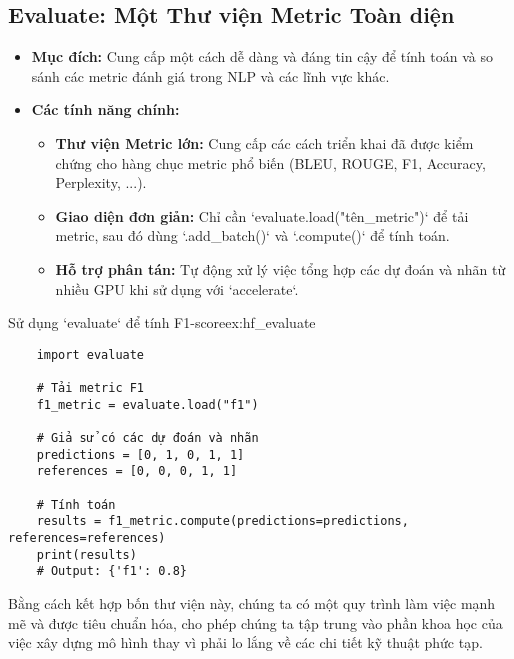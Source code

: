 \subsection{Evaluate: Một Thư viện Metric Toàn diện}
\label{ssec:hf_evaluate}
\begin{itemize}
    \item \textbf{Mục đích:} Cung cấp một cách dễ dàng và đáng tin cậy để tính toán và so sánh các metric đánh giá trong NLP và các lĩnh vực khác.
    \item \textbf{Các tính năng chính:}
        \begin{itemize}
            \item \textbf{Thư viện Metric lớn:} Cung cấp các cách triển khai đã được kiểm chứng cho hàng chục metric phổ biến (BLEU, ROUGE, F1, Accuracy, Perplexity, ...).
            \item \textbf{Giao diện đơn giản:} Chỉ cần `evaluate.load("tên\_metric")` để tải metric, sau đó dùng `.add\_batch()` và `.compute()` để tính toán.
            \item \textbf{Hỗ trợ phân tán:} Tự động xử lý việc tổng hợp các dự đoán và nhãn từ nhiều GPU khi sử dụng với `accelerate`.
        \end{itemize}
\end{itemize}
\begin{example}{Sử dụng `evaluate` để tính F1-score}{ex:hf_evaluate}
    \begin{verbatim}
    import evaluate

    # Tải metric F1
    f1_metric = evaluate.load("f1")

    # Giả sử có các dự đoán và nhãn
    predictions = [0, 1, 0, 1, 1]
    references = [0, 0, 0, 1, 1]

    # Tính toán
    results = f1_metric.compute(predictions=predictions, references=references)
    print(results)
    # Output: {'f1': 0.8}
    \end{verbatim}
\end{example}

Bằng cách kết hợp bốn thư viện này, chúng ta có một quy trình làm việc mạnh mẽ và được tiêu chuẩn hóa, cho phép chúng ta tập trung vào phần khoa học của việc xây dựng mô hình thay vì phải lo lắng về các chi tiết kỹ thuật phức tạp.